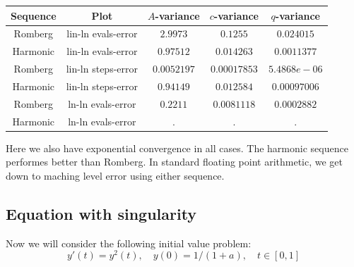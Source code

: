 \begin{table}[H]
    \centering
    \begin{tabular}{c|c||c|c|c}
Sequence & Plot & \(A\)-variance & \(c\)-variance & \(q\)-variance\\\hline
Romberg & lin-ln evals-error & \(2.9973\) & \(0.1255\) & \(0.024015\) \\
Harmonic & lin-ln evals-error & \(0.97512\) & \(0.014263\) & \(0.0011377\) \\
Romberg & lin-ln steps-error & \(0.0052197\) & \(0.00017853\) & \(5.4868e-06\) \\
Harmonic & lin-ln steps-error & \(0.94149\) & \(0.012584\) & \(0.00097006\) \\
Romberg & ln-ln evals-error & \(0.2211\) & \(0.0081118\) & \(0.0002882\) \\
Harmonic & ln-ln evals-error & . & . & . \\
    \end{tabular}
    \label{tab:my_label}
\end{table}

Here we also have exponential convergence in all cases. The harmonic sequence performes better than Romberg. In standard floating point arithmetic, we get down to maching level error using either sequence.

\subsection{Equation with singularity}

Now we will consider the following initial value problem:
\begin{equation}\label{46}
y'(t) = y^2(t),\quad y(0) = 1/(1+a), \quad t\in [0,1]
\end{equation}

